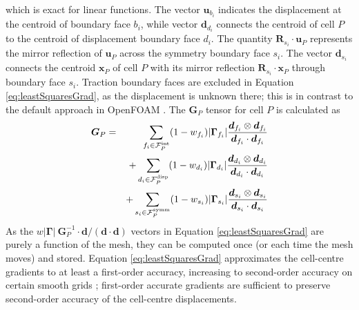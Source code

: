 \documentclass[sn-mathphys,Numbered]{sn-jnl}%
\newcommand{\bb}{\boldsymbol}
\begin{document}
which is exact for linear functions.
The vector $\bb{u}_{b_i}$ indicates the displacement at the centroid of boundary face ${b_i}$, while vector $\bb{d}_{d_i}$ connects the centroid of cell $P$ to the centroid of displacement boundary face $d_i$.
The quantity $\bb{R}_{s_i} \cdot \bb{u}_P$ represents the mirror reflection of $\bb{u}_P$ across the symmetry boundary face $s_i$.
The vector $\bb{d}_{s_i}$ connects the centroid $\bb{x}_P$ of cell $P$ with its mirror reflection $\bb{R}_{s_i}  \cdot \bb{x}_P$ through boundary face $s_i$.
Traction boundary faces are excluded in Equation \ref{eq:leastSquaresGrad}, as the displacement is unknown there; this is in contrast to the default approach in OpenFOAM \citep{Jasak2011}.
The $\bb{G}_P$ tensor for cell $P$ is calculated as
\begin{eqnarray}
	 \bb{G}_P &=&
	 \sum_{{f_i} \in \mathcal{F}^{\text{int}}_P} (1 - w_{f_i}) |\bb{\Gamma}_{f_i}|  \frac{\bb{d}_{f_i} \otimes \bb{d}_{f_i}}{\bb{d}_{f_i} \cdot \bb{d}_{f_i}} \notag \\
	 &&+  \sum_{{d_i} \in \mathcal{F}^{\text{disp}}_P} (1 - w_{d_i}) |\bb{\Gamma}_{d_i}|  \frac{\bb{d}_{d_i} \otimes \bb{d}_{d_i}}{\bb{d}_{d_i} \cdot \bb{d}_{d_i}} \notag \\
	 && +  \sum_{{s_i} \in \mathcal{F}^{\text{symm}}_P} (1 - w_{s_i}) |\bb{\Gamma}_{s_i}|  \frac{\bb{d}_{s_i} \otimes \bb{d}_{s_i}}{\bb{d}_{s_i} \cdot \bb{d}_{s_i}}
\end{eqnarray}
As the $w |\bb{\Gamma}| \ \bb{G}^{-1}_P \cdot \bb{d}/(\bb{d}\cdot \bb{d})$ vectors in Equation \ref{eq:leastSquaresGrad} are purely a function of the mesh, they can be computed once (or each time the mesh moves) and stored.
Equation \ref{eq:leastSquaresGrad} approximates the cell-centre gradients to at least a first-order accuracy, increasing to second-order accuracy on certain smooth grids \citep{Syrakos2023};
first-order accurate gradients are sufficient to preserve second-order accuracy of the cell-centre displacements.
\end{document}
